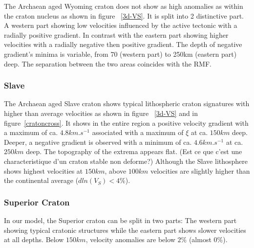 \documentclass[12pt]{article}
\begin{document}


The Archaean aged Wyoming craton does not show as high anomalies as within the craton nucleus as shown in figure ~\ref{3d-VS}. 
It is split into 2 distinctive part. A western part showing low velocities influenced by the active tectonic with a radially positive gradient. 
In contrast with the eastern part showing higher velocities with a radially negative then positive gradient. 
The depth of negative gradient's minima is variable, from 70 (western part) to 250km (eastern part) deep. 
The separation between the two areas coincides with the RMF.

\subsubsection{Slave}




	The Archaean aged Slave craton shows typical lithospheric craton signatures with higher than average velocities as shown in figure ~\ref{3d-VS} and in figure~\ref{cratoncross}. 
	It shows in the entire region a positive velocity gradient with a maximum of ca. $4.8km.s^{-1}$ associated with a maximum of $\xi$ at ca. $150km$ deep.
	Deeper, a negative gradient is observed with a minimum of ca. $4.6km.s^{-1}$ at ca. $250km$ deep. 
	The topography of the extrema appears flat. (Est ce que c'est une characteristique d'un craton stable non deforme?)
	Although the Slave lithosphere shows highest velocities at $150km$, above $100km$ velocities are slightly higher than the continental average ($dln(V_S)< 4\%$).

\subsubsection{Superior Craton}
	In our model, the Superior craton can be split in two parts: The western part showing typical cratonic structures while the eastern part shows slower velocities at all depths. Below $150km$, velocity anomalies are below $2\%$ (almost $0\%$). 
\end{document}
